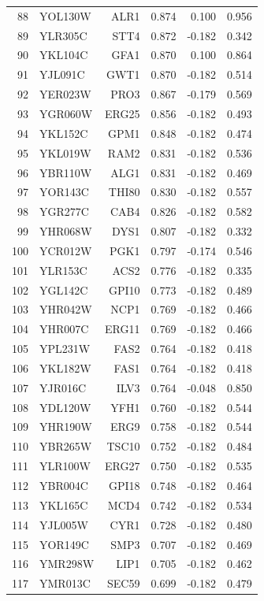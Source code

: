 \begin{longtable}{rlrrrr}
88 & YOL130W & ALR1 & 0.874 & 0.100 & 0.956\\
89 & YLR305C & STT4 & 0.872 & -0.182 & 0.342\\
90 & YKL104C & GFA1 & 0.870 & 0.100 & 0.864\\
91 & YJL091C & GWT1 & 0.870 & -0.182 & 0.514\\
92 & YER023W & PRO3 & 0.867 & -0.179 & 0.569\\
93 & YGR060W & ERG25 & 0.856 & -0.182 & 0.493\\
94 & YKL152C & GPM1 & 0.848 & -0.182 & 0.474\\
95 & YKL019W & RAM2 & 0.831 & -0.182 & 0.536\\
96 & YBR110W & ALG1 & 0.831 & -0.182 & 0.469\\
97 & YOR143C & THI80 & 0.830 & -0.182 & 0.557\\
98 & YGR277C & CAB4 & 0.826 & -0.182 & 0.582\\
99 & YHR068W & DYS1 & 0.807 & -0.182 & 0.332\\
100 & YCR012W & PGK1 & 0.797 & -0.174 & 0.546\\
101 & YLR153C & ACS2 & 0.776 & -0.182 & 0.335\\
102 & YGL142C & GPI10 & 0.773 & -0.182 & 0.489\\
103 & YHR042W & NCP1 & 0.769 & -0.182 & 0.466\\
104 & YHR007C & ERG11 & 0.769 & -0.182 & 0.466\\
105 & YPL231W & FAS2 & 0.764 & -0.182 & 0.418\\
106 & YKL182W & FAS1 & 0.764 & -0.182 & 0.418\\
107 & YJR016C & ILV3 & 0.764 & -0.048 & 0.850\\
108 & YDL120W & YFH1 & 0.760 & -0.182 & 0.544\\
109 & YHR190W & ERG9 & 0.758 & -0.182 & 0.544\\
110 & YBR265W & TSC10 & 0.752 & -0.182 & 0.484\\
111 & YLR100W & ERG27 & 0.750 & -0.182 & 0.535\\
112 & YBR004C & GPI18 & 0.748 & -0.182 & 0.464\\
113 & YKL165C & MCD4 & 0.742 & -0.182 & 0.534\\
114 & YJL005W & CYR1 & 0.728 & -0.182 & 0.480\\
115 & YOR149C & SMP3 & 0.707 & -0.182 & 0.469\\
116 & YMR298W & LIP1 & 0.705 & -0.182 & 0.462\\
117 & YMR013C & SEC59 & 0.699 & -0.182 & 0.479\\

\end{longtable}
